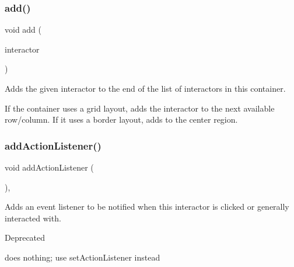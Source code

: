 \subsubsection{\texorpdfstring{add()}{add()}\hspace{0.1cm}{\footnotesize\ttfamily [2/2]}}
{\footnotesize\ttfamily void add (\begin{DoxyParamCaption}\item[{\mbox{\hyperlink{classsgl_1_1GInteractor}{G\+Interactor}} \&}]{interactor }\end{DoxyParamCaption})\hspace{0.3cm}{\ttfamily [virtual]}}



Adds the given interactor to the end of the list of interactors in this container. 

If the container uses a grid layout, adds the interactor to the next available row/column. If it uses a border layout, adds to the center region. \mbox{\label{classsgl_1_1GInteractor_a02f20ea6edfa0671f31c4c648a253833}} 
\subsubsection{\texorpdfstring{add\+Action\+Listener()}{addActionListener()}}
{\footnotesize\ttfamily void add\+Action\+Listener (\begin{DoxyParamCaption}{ }\end{DoxyParamCaption})\hspace{0.3cm}{\ttfamily [virtual]}, {\ttfamily [inherited]}}



Adds an event listener to be notified when this interactor is clicked or generally interacted with. 

\begin{DoxyRefDesc}{Deprecated}
\item[\mbox{\hyperlink{deprecated__deprecated000006}{Deprecated}}]does nothing; use set\+Action\+Listener instead \end{DoxyRefDesc}
\mbox{\label{classsgl_1_1GContainer_adf2c09cdcbf0f38c03d75a250fd8ce5d}} 
